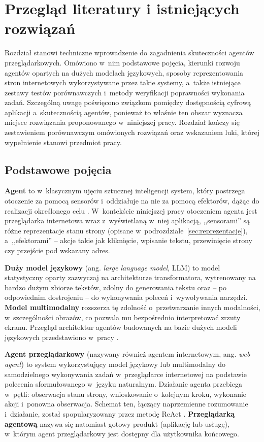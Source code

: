 \section{Przegląd literatury i istniejących rozwiązań}
\label{chap:pierwszy}
Rozdział stanowi techniczne wprowadzenie do zagadnienia skuteczności agentów przeglądarkowych. Omówiono w~nim podstawowe pojęcia, kierunki rozwoju agentów opartych na dużych modelach językowych, sposoby reprezentowania stron internetowych wykorzystywane przez takie systemy, a~także istniejące zestawy testów porównawczych i~metody weryfikacji poprawności wykonania zadań. Szczególną uwagę poświęcono związkom pomiędzy dostępnością cyfrową aplikacji a~skutecznością agentów, ponieważ to właśnie ten obszar wyznacza miejsce rozwiązania proponowanego w~niniejszej pracy. Rozdział kończy się zestawieniem porównawczym omówionych rozwiązań oraz wskazaniem luki, której wypełnienie stanowi przedmiot pracy.

\subsection{Podstawowe pojęcia}
\label{sec:pojecia}

\textbf{Agent} to w~klasycznym ujęciu sztucznej inteligencji system, który postrzega otoczenie za pomocą sensorów i~oddziałuje na nie za pomocą efektorów, dążąc do realizacji określonego celu \citep{russell2021aima}. W~kontekście niniejszej pracy otoczeniem agenta jest przeglądarka internetowa wraz z~wyświetlaną w~niej aplikacją, ,,sensorami'' są różne reprezentacje stanu strony (opisane w~podrozdziale~\ref{sec:reprezentacje}), a~,,efektorami'' -- akcje takie jak kliknięcie, wpisanie tekstu, przewinięcie strony czy przejście pod wskazany adres.

\textbf{Duży model językowy} (ang. \textit{large language model}, LLM) to model statystyczny oparty zazwyczaj na architekturze transformatora, wytrenowany na bardzo dużym zbiorze tekstów, zdolny do generowania tekstu oraz -- po odpowiednim dostrojeniu -- do wykonywania poleceń i~wywoływania narzędzi. \textbf{Model multimodalny} rozszerza tę zdolność o~przetwarzanie innych modalności, w~szczególności obrazów, co pozwala mu bezpośrednio interpretować zrzuty ekranu. Przegląd architektur agentów budowanych na bazie dużych modeli językowych przedstawiono w~pracy \cite{wang2024survey}.

\textbf{Agent przeglądarkowy} (nazywany również agentem internetowym, ang. \textit{web agent}) to system wykorzystujący model językowy lub multimodalny do samodzielnego wykonywania zadań w~przeglądarce internetowej na podstawie polecenia sformułowanego w~języku naturalnym. Działanie agenta przebiega w~pętli: obserwacja stanu strony, wnioskowanie o~kolejnym kroku, wykonanie akcji i~ponowna obserwacja. Schemat ten, łączący naprzemienne rozumowanie i~działanie, został spopularyzowany przez metodę ReAct \citep{yao2023react}. \textbf{Przeglądarką agentową} nazywa się natomiast gotowy produkt (aplikację lub usługę), w~którym agent przeglądarkowy jest dostępny dla użytkownika końcowego.

